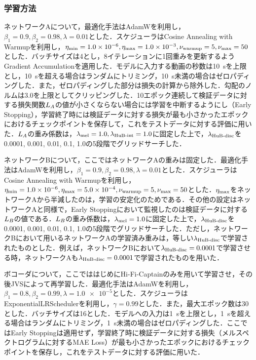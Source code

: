 \subsubsection{学習方法}
ネットワークAについて，最適化手法はAdamW\cite{loshchilov2017decoupled}を利用し，$\beta_{1} = 0.9, \beta_{2} = 0.98, \lambda = 0.01$とした．スケジューラはCosine Annealing with Warmupを利用し，$\eta_{\text{min}} = 1.0 \times 10^{-6}, \eta_{\text{max}} = 1.0 \times 10^{-3}, \nu_{\text{warmup}} = 5, \nu_{\text{max}} = 50$とした．バッチサイズは4とし，8イテレーションに1回重みを更新するようGradient Accumulationを適用した．モデルに入力する動画の秒数は\SI{10}{\s}を上限とし，\SI{10}{\s}を超える場合はランダムにトリミング，\SI{10}{\s}未満の場合はゼロパディングした．また，ゼロパディングした部分は損失の計算から除外した．勾配のノルムは3.0を上限としてクリッピングした．10エポック連続して検証データに対する損失関数$L_{A}$の値が小さくならない場合には学習を中断するようにし（Early Stopping），学習終了時には検証データに対する損失が最も小さかったエポックにおけるチェックポイントを保存して，これをテストデータに対する評価に用いた．$L_{A}$の重み係数は，$\lambda_{\text{mel}} = 1.0, \lambda_{\text{HuB-int}} = 1.0$に固定した上で，$\lambda_{\text{HuB-disc}}$を0.0001, 0.001, 0.01, 0.1, 1.0の5段階でグリッドサーチした．

ネットワークBについて，ここではネットワークAの重みは固定した．最適化手法はAdamWを利用し，$\beta_{1} = 0.9, \beta_{2} = 0.98, \lambda = 0.01$とした．スケジューラはCosine Annealing with Warmupを利用し，$\eta_{\text{min}} = 1.0 \times 10^{-6}, \eta_{\text{max}} = 5.0 \times 10^{-4}, \nu_{\text{warmup}} = 5, \nu_{\text{max}} = 50$とした．$\eta_{\text{max}}$をネットワークAから半減したのは，学習の安定化のためである．その他の設定はネットワークAと同様で，Early Stoppingにおいて監視したのは検証データに対する$L_{B}$の値である．$L_{B}$の重み係数は，$\lambda_{\text{mel}} = 1.0$に固定した上で，$\lambda_{\text{HuB-disc}}$を0.0001, 0.001, 0.01, 0.1, 1.0の5段階でグリッドサーチした．ただし，ネットワークBにおいて用いるネットワークAの学習済み重みは，等しい$\lambda_{\text{HuB-disc}}$で学習されたものとした．例えば，ネットワークBにおいて$\lambda_{\text{HuB-disc}} = 0.0001$で学習させる時，ネットワークAも$\lambda_{\text{HuB-disc}} = 0.0001$で学習されたものを用いた．

ボコーダについて，ここでははじめにHi-Fi-Captainのみを用いて学習させ，その後JVSによって再学習した．最適化手法はAdamWを利用し，$\beta_{1} = 0.8, \beta_{2} = 0.99, \lambda = \num{1.0e-5}$とした．スケジューラはExponentialLRSchedulerを利用し，$\gamma = 0.99$とした．また，最大エポック数は30とした．バッチサイズは16とした．モデルへの入力は\SI{1}{\s}を上限とし，\SI{1}{\s}を超える場合はランダムにトリミング，\SI{1}{\s}未満の場合はゼロパディングした．ここではEarly Stoppingは適用せず，学習終了時に検証データに対する損失（メルスペクトログラムに対するMAE Loss）が最も小さかったエポックにおけるチェックポイントを保存し，これをテストデータに対する評価に用いた．

